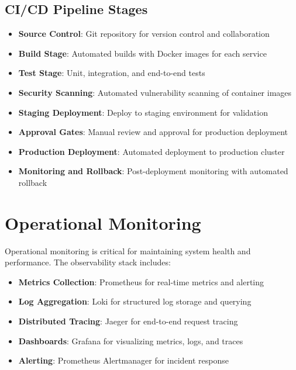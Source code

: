 \documentclass[12pt]{report}
\begin{document}
\subsection{CI/CD Pipeline Stages}
\begin{itemize}
  \item \textbf{Source Control}: Git repository for version control and collaboration
  \item \textbf{Build Stage}: Automated builds with Docker images for each service
  \item \textbf{Test Stage}: Unit, integration, and end-to-end tests
  \item \textbf{Security Scanning}: Automated vulnerability scanning of container images
  \item \textbf{Staging Deployment}: Deploy to staging environment for validation
  \item \textbf{Approval Gates}: Manual review and approval for production deployment
  \item \textbf{Production Deployment}: Automated deployment to production cluster
  \item \textbf{Monitoring and Rollback}: Post-deployment monitoring with automated rollback
\end{itemize}   

\section{Operational Monitoring}
Operational monitoring is critical for maintaining system health and performance. The observability stack includes:
\begin{itemize}
  \item \textbf{Metrics Collection}: Prometheus for real-time metrics and alerting
  \item \textbf{Log Aggregation}: Loki for structured log storage and querying
  \item \textbf{Distributed Tracing}: Jaeger for end-to-end request tracing
  \item \textbf{Dashboards}: Grafana for visualizing metrics, logs, and traces
  \item \textbf{Alerting}: Prometheus Alertmanager for incident response
\end{itemize}
\end{document}
